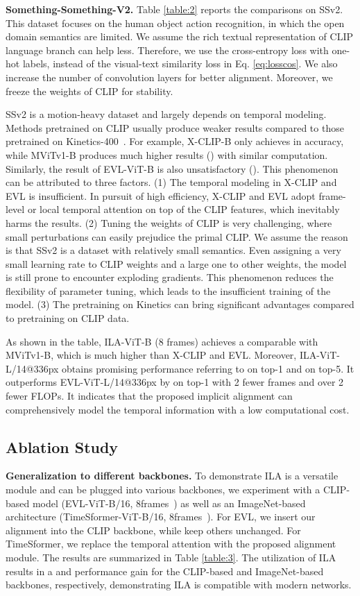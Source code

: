 \documentclass[10pt,twocolumn,letterpaper]{article}
\begin{document}
\vspace{0.05in}
\noindent \textbf{Something-Something-V2.} Table \ref{table:2} reports the comparisons on SSv2.
This dataset focuses on the human object action recognition, in which the open domain semantics are limited.
We assume the rich textual representation of CLIP language branch can help less.
Therefore, we use the cross-entropy loss with one-hot labels, instead of the visual-text similarity loss in Eq. \eqref{eq:losscos}.
We also increase the number of convolution layers for better alignment.
Moreover, we freeze the weights of CLIP for stability.

SSv2 is a motion-heavy dataset and largely depends on temporal modeling.
Methods pretrained on CLIP usually produce weaker results compared to those pretrained on Kinetics-400~.
For example, X-CLIP-B only achieves  in accuracy, while MViTv1-B produces much higher results () with similar computation.
Similarly, the result of EVL-ViT-B is also unsatisfactory ().
This phenomenon can be attributed to three factors. 
(1) The temporal modeling in X-CLIP and EVL is insufficient. In pursuit of high efficiency, X-CLIP and EVL adopt frame-level or local temporal attention on top of the CLIP features, which inevitably harms the results.
(2) Tuning the weights of CLIP is very challenging, where small perturbations can easily prejudice the primal CLIP.
We assume the reason is that SSv2 is a dataset with relatively small semantics.
Even assigning a very small learning rate to CLIP weights and a large one to other weights, the model is still prone to encounter exploding gradients.
This phenomenon reduces the flexibility of parameter tuning, which leads to the insufficient training of the model.
(3) The pretraining on Kinetics can bring significant advantages compared to pretraining on CLIP data.

As shown in the table, ILA-ViT-B (8 frames) achieves a comparable  with MViTv1-B, which is much higher than X-CLIP and EVL.
Moreover, ILA-ViT-L/14@336px obtains promising performance referring to  on top-1 and  on top-5. It outperforms EVL-ViT-L/14@336px by  on top-1 with 2 fewer frames and over 2 fewer FLOPs.
It indicates that the proposed implicit alignment can comprehensively model the temporal information with a low computational cost.

\subsection{Ablation Study}

\noindent\textbf{Generalization to different backbones.} To demonstrate ILA is a versatile module and can be plugged into various backbones, we experiment with a CLIP-based model (EVL-ViT-B/16, 8frames~\cite{b25}) as well as an ImageNet-based architecture (TimeSformer-ViT-B/16, 8frames~\cite{b13}).  
For EVL, we insert our alignment into the CLIP backbone, while keep others unchanged.
For TimeSformer, we replace the temporal attention with the proposed alignment module.
The results are summarized in Table \ref{table:3}. 
The utilization of ILA results in a  and  performance gain for the CLIP-based and ImageNet-based backbones, respectively, demonstrating ILA is compatible with modern networks.
\end{document}
